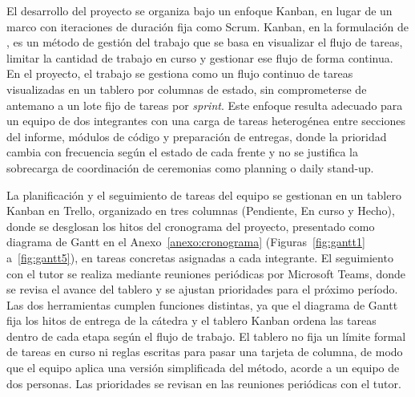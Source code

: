 El desarrollo del proyecto se organiza bajo un enfoque Kanban, en lugar de un marco con iteraciones de duración fija como Scrum.
Kanban, en la formulación de \textcite{Anderson2010}, es un método de gestión del trabajo que se basa en visualizar el flujo de tareas, limitar la cantidad de trabajo en curso y gestionar ese flujo de forma continua.
En el proyecto, el trabajo se gestiona como un flujo continuo de tareas visualizadas en un tablero por columnas de estado, sin comprometerse de antemano a un lote fijo de tareas por \textit{sprint}.
Este enfoque resulta adecuado para un equipo de dos integrantes con una carga de tareas heterogénea entre secciones del informe, módulos de código y preparación de entregas, donde la prioridad cambia con frecuencia según el estado de cada frente y no se justifica la sobrecarga de coordinación de ceremonias como planning o daily stand-up.

La planificación y el seguimiento de tareas del equipo se gestionan en un tablero Kanban en Trello, organizado en tres columnas (Pendiente, En curso y Hecho), donde se desglosan los hitos del cronograma del proyecto, presentado como diagrama de Gantt en el Anexo~\ref{anexo:cronograma} (Figuras~\ref{fig:gantt1} a~\ref{fig:gantt5}), en tareas concretas asignadas a cada integrante.
El seguimiento con el tutor se realiza mediante reuniones periódicas por Microsoft Teams, donde se revisa el avance del tablero y se ajustan prioridades para el próximo período.
Las dos herramientas cumplen funciones distintas, ya que el diagrama de Gantt fija los hitos de entrega de la cátedra y el tablero Kanban ordena las tareas dentro de cada etapa según el flujo de trabajo.
El tablero no fija un límite formal de tareas en curso ni reglas escritas para pasar una tarjeta de columna, de modo que el equipo aplica una versión simplificada del método, acorde a un equipo de dos personas.
Las prioridades se revisan en las reuniones periódicas con el tutor.

